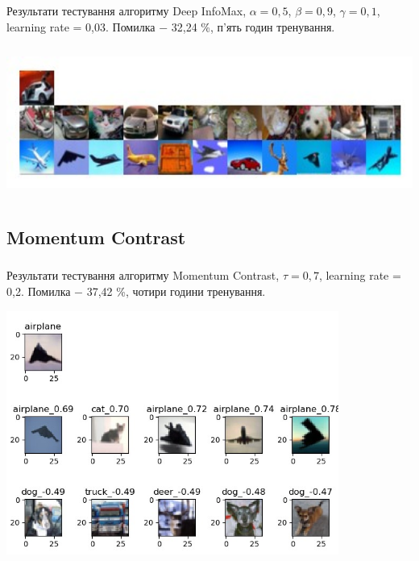 \documentclass[c]{beamer}
\begin{document}
\begin{frame}
	\frametitle{\insertsection}
	\framesubtitle{\insertsubsection}

	Результати тестування алгоритму Deep InfoMax, $\alpha = 0,5$, $\beta = 0,9$, $\gamma = 0,1$, learning rate = 0,03. Помилка $-$ 32,24 \%, п'ять годин тренування.
		
    \includegraphics[width=\textwidth, height=5cm, natwidth=375, natheight=121]{deepinfodemo3.jpg}


\end{frame}


\subsection{Momentum Contrast}

\begin{frame}
	\frametitle{\insertsection}
	\framesubtitle{\insertsubsection}

	Результати тестування алгоритму Momentum Contrast, $\tau = 0,7$, learning rate = 0,2. Помилка $-$ 37,42 \%, чотири години тренування.
	
    \includegraphics[width=\textwidth, height=8cm, natwidth=621, natheight=456]{mocodemo3.jpg}

\end{frame}
\end{document}
